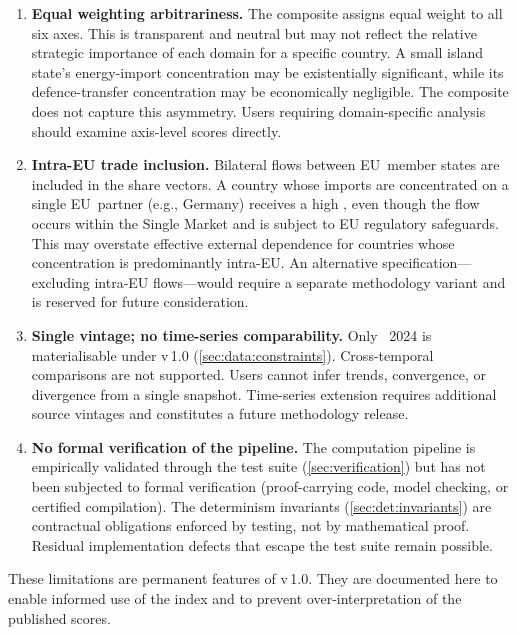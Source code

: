 \begin{enumerate}[label=\textbf{L\arabic*}.]
  \item \textbf{Equal weighting arbitrariness.}
    The composite assigns equal weight to all six axes.  This is transparent
    and neutral but may not reflect the relative strategic importance of each
    domain for a specific country.  A small island state's energy-import
    concentration may be existentially significant, while its defence-transfer
    concentration may be economically negligible.  The composite does not
    capture this asymmetry.  Users requiring domain-specific analysis should
    examine axis-level scores directly.

  \item \textbf{Intra-EU trade inclusion.}
    Bilateral flows between EU~member states are included in the share
    vectors.  A country whose imports are concentrated on a single
    EU~partner (e.g., Germany) receives a high \HHI, even though the
    flow occurs within the Single Market and is subject to EU regulatory
    safeguards.  This may overstate effective external dependence for
    countries whose concentration is predominantly intra-EU.  An
    alternative specification---excluding intra-EU flows---would require a
    separate methodology variant and is reserved for future consideration.

  \item \textbf{Single vintage; no time-series comparability.}
    Only {\ISI}~2024 is materialisable under v\,1.0
    (\cref{sec:data:constraints}).  Cross-temporal comparisons are not
    supported.  Users cannot infer trends, convergence, or divergence from a
    single snapshot.  Time-series extension requires additional source
    vintages and constitutes a future methodology release.

  \item \textbf{No formal verification of the pipeline.}
    The computation pipeline is empirically validated through the test suite
    (\cref{sec:verification}) but has not been subjected to formal
    verification (proof-carrying code, model checking, or certified
    compilation).  The determinism invariants (\cref{sec:det:invariants}) are
    contractual obligations enforced by testing, not by mathematical proof.
    Residual implementation defects that escape the test suite remain
    possible.

\end{enumerate}

These limitations are permanent features of v\,1.0.  They are documented
here to enable informed use of the index and to prevent over-interpretation
of the published scores.